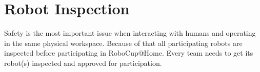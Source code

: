 \begin{enumerate}
\end{enumerate}

\section{Robot Inspection}
\label{sec:robot_inspection}
Safety is the most important issue when interacting with humans and operating in the same physical workspace. Because of that all participating robots are inspected before participating in RoboCup@Home. Every team needs to get its robot(s) inspected and approved for participation.

